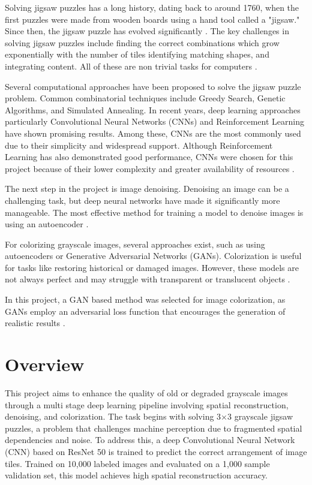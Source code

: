 \documentclass[%
 reprint,
 amsmath,amssymb,
 aps,
]{revtex4-2}
\begin{document}
Solving jigsaw puzzles has a long history, dating back to around 1760, when the first puzzles were made from wooden boards using a hand tool called a "jigsaw." Since then, the jigsaw puzzle has evolved significantly \cite{jigsaw1}. The key challenges in solving jigsaw puzzles include finding the correct combinations which grow exponentially with the number of tiles identifying matching shapes, and integrating content. All of these are non trivial tasks for computers \cite{jigsaw2}.

Several computational approaches have been proposed to solve the jigsaw puzzle problem. Common combinatorial techniques include Greedy Search, Genetic Algorithms, and Simulated Annealing. In recent years, deep learning approaches particularly Convolutional Neural Networks (CNNs) and Reinforcement Learning have shown promising results. Among these, CNNs are the most commonly used due to their simplicity and widespread support. Although Reinforcement Learning has also demonstrated good performance, CNNs were chosen for this project because of their lower complexity and greater availability of resources \cite{jigsaw2}.

The next step in the project is image denoising. Denoising an image can be a challenging task, but deep neural networks have made it significantly more manageable. The most effective method for training a model to denoise images is using an autoencoder \cite{denoising}.

For colorizing grayscale images, several approaches exist, such as using autoencoders or Generative Adversarial Networks (GANs). Colorization is useful for tasks like restoring historical or damaged images. However, these models are not always perfect and may struggle with transparent or translucent objects \cite{color}. 

In this project, a GAN based method was selected for image colorization, as GANs employ an adversarial loss function that encourages the generation of realistic results \cite{color2}.




\section{\label{sec:overview}Overview} %

This project aims to enhance the quality of old or degraded grayscale images through a multi stage deep learning pipeline involving spatial reconstruction, denoising, and colorization. The task begins with solving 3×3 grayscale jigsaw puzzles, a problem that challenges machine perception due to fragmented spatial dependencies and noise. To address this, a deep Convolutional Neural Network (CNN) based on ResNet 50 is trained to predict the correct arrangement of image tiles. Trained on 10,000 labeled images and evaluated on a 1,000 sample validation set, this model achieves high spatial reconstruction accuracy.
\end{document}
